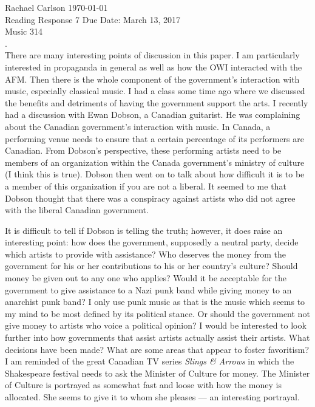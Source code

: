 \documentclass[12pt]{article}
\begin{document}
\noindent Rachael Carlson \hfill \today\\
\noindent Reading Response 7 \hfill Due Date: March 13, 2017\\
\noindent Music 314\\

\noindent {}.\\

\noindent There are many interesting points of discussion in this paper. I am particularly interested in propaganda in general as well as how the OWI interacted with the AFM. Then there is the whole component of the government's interaction with music, especially classical music. I had a class some time ago where we discussed the benefits and detriments of having the government support the arts. I recently had a discussion with Ewan Dobson, a Canadian guitarist. He was complaining about the Canadian government's interaction with music. In Canada, a performing venue needs to ensure that a certain percentage of its performers are Canadian. From Dobson's perspective, these performing artists need to be members of an organization within the Canada government's ministry of culture (I think this is true). Dobson then went on to talk about how difficult it is to be a member of this organization if you are not a liberal. It seemed to me that Dobson thought that there was a conspiracy against artists who did not agree with the liberal Canadian government.

It is difficult to tell if Dobson is telling the truth; however, it does raise an interesting point: how does the government, supposedly a neutral party, decide which artists to provide with assistance? Who deserves the money from the government for his or her contributions to his or her country's culture? Should money be given out to any one who applies? Would it be acceptable for the government to give assistance to a Nazi punk band while giving money to an anarchist punk band? I only use punk music as that is the music which seems to my mind to be most defined by its political stance. Or should the government not give money to artists who voice a political opinion? I would be interested to look further into how governments that assist artists actually assist their artists. What decisions have been made? What are some areas that appear to foster favoritism? I am reminded of the great Canadian TV series \emph{Slings \& Arrows} in which the Shakespeare festival needs to ask the Minister of Culture for money. The Minister of Culture is portrayed as somewhat fast and loose with how the money is allocated. She seems to give it to whom she pleases --- an interesting portrayal.  \\
\end{document}
